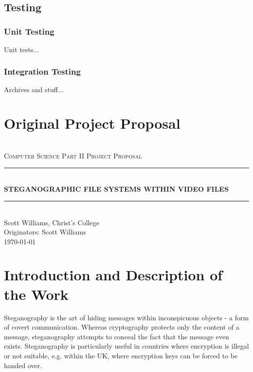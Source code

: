 \documentclass[paper=a4, fontsize=11pt,twoside]{scrartcl}
\makeatletter
\numberwithin{table}{section}
\numberwithin{figure}{section}
\numberwithin{algorithm}{section}
\newcommand{\HRule}[1]{\rule{\linewidth}{#1}}
\def\printauthor{%
    {\large \@author}}
\makeatother
\begin{document}
\subsection{Testing}
\label{app:codetest}

\subsubsection{Unit Testing}

Unit tests...

\subsubsection{Integration Testing}

Archives and stuff...

\vfill
\pagebreak

\section{Original Project Proposal} 

\begin{center}	
 	~\\[2.0cm]			
	\normalsize \textsc{Computer Science Part II Project Proposal}\\[2.0cm]     
    \HRule{0.5pt} \\                        
    \LARGE \textbf{\uppercase{Steganographic file systems within video files}}    
    \HRule{2pt} \\[30pt]        
    \normalsize Scott Williams, Christ's College\\[2pt]Originators: Scott Williams\\[25pt]           
    \normalsize \today            
     \vfill
\end{center}
\printauthor                
\newpage
\section*{Introduction and Description of the Work}

Steganography is the art of hiding messages within inconspicuous objects - a form of covert communication. Whereas cryptography protects only the content of a message, steganography attempts to conceal the fact that the message even exists. Steganography is particularly useful in countries where encryption is illegal or not suitable, e.g. within the UK, where encryption keys can be forced to be handed over.
\end{document}
